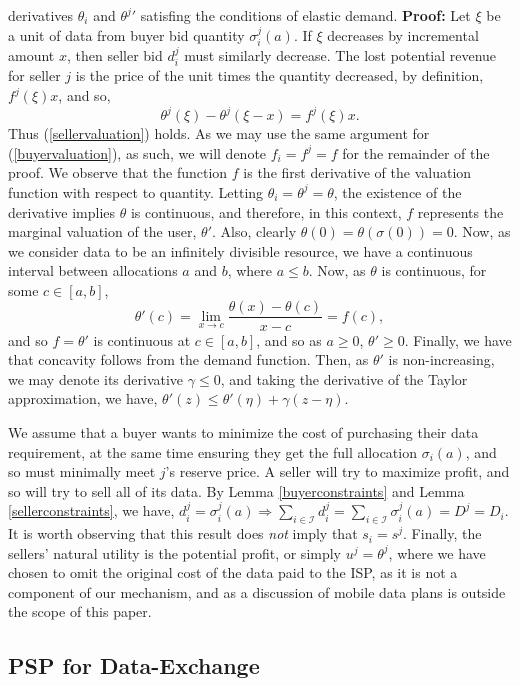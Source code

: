 \documentclass[12pt]{article}
\theoremstyle{definition}
\newcommand{\mcI}{\mathcal{I}}
\newcommand{\g}{\sigma}
\begin{document}
\begin{multicols}{2}
{derivatives
${\theta_i}$ and ${\theta^j}'$ satisfing the conditions of elastic demand.
}
\textbf{Proof:} 
Let $\xi$
be a unit of data from buyer bid quantity $\g_i^j(a)$.
If $\xi$ decreases by incremental amount $x$, then seller bid $d_i^j$ must
similarly decrease. The lost potential revenue for seller $j$ is the price of
the unit times the quantity decreased, by definition, $f^j(\xi)x$, and so,
$$
    \theta^j(\xi) - \theta^j(\xi-x) = f^j(\xi)x.
$$
Thus (\ref{sellervaluation}) holds.
As we may use the same argument for (\ref{buyervaluation}), as such, we will
denote $f_i=f^j=f$ for the remainder of the proof. We observe that the function
$f$ is the first
derivative of the valuation function with respect to
quantity. Letting $\theta_i=\theta^j=\theta$, the existence of the derivative implies $\theta$ 
is continuous, and therefore, in this context, $f$ represents
the marginal valuation of the user, ${\theta}'$. Also, clearly
$\theta(0)=\theta(\sigma(0)) = 0$. Now, as we consider data to be an infinitely
divisible resource, we have a continuous interval between allocations $a$ and
$b$, where $a\le b$. Now, as $\theta$ is continuous, for some $c\in[a,b]$, 
$$
\theta'(c) = \lim_{x\to c}\frac{\theta(x) - \theta(c)}{x-c} = f(c),
$$
and so $f=\theta'$ is continuous at $c\in[a,b]$, and so as $a\ge 0$, 
$\theta'\ge 0$. Finally, we have that concavity follows from the demand
function. Then, as $\theta'$ is
non-increasing, we may denote its derivative $\gamma \le 0$,
and taking the derivative of the Taylor approximation, we have, $\theta'(z) \le
\theta'(\eta) + \gamma(z-\eta)$.

We assume that a buyer wants to minimize the cost of purchasing their data
requirement, at the same time ensuring they get the full allocation $\g_i(a)$,
and so must minimally meet $j$'s reserve price. 
A seller will try to maximize profit, 
and so will try to sell all of its data.  By Lemma
\ref{buyerconstraints} and Lemma \ref{sellerconstraints}, we have,
$d_i^j = \g_i^j(a) \Rightarrow \sum_{i\in{\mcI}} d_i^j =
\sum_{i\in\mcI} \g_i^j(a) = D^j = D_i$. It is worth observing that this result
does \emph{not} imply that $s_i=s^j$. 
Finally, the sellers' natural utility is the potential
profit, or simply $u^j = \theta^j$, where we have chosen to omit the original cost of the data
paid to the ISP, as it is not a component of our mechanism, and as a discussion
of mobile data plans is outside the scope of this paper.  

\subsection{PSP for Data-Exchange}


\end{multicols}
\end{document}
